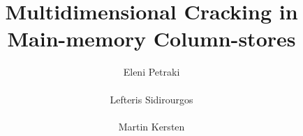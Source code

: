 \documentclass{sig-alternate}
\begin{document}
\title{Multidimensional Cracking in Main-memory Column-stores}

\author{
\alignauthor Eleni Petraki\\
       \\
\alignauthor Lefteris Sidirourgos\\
       \\
\alignauthor Martin Kersten\\
      \\
}

\maketitle












\end{document}
